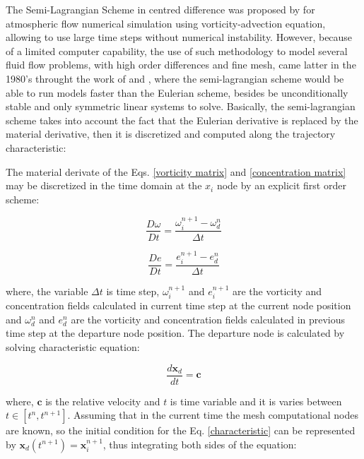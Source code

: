 The Semi-Lagrangian Scheme in centred difference was proposed by \cite{sawyer1963} for atmospheric flow numerical simulation using vorticity-advection equation, allowing to use large time steps without numerical instability. 
However, because of a limited computer capability, the use of such methodology to model several fluid flow problems, with high order differences and fine mesh, came latter in the 1980's throught the work of \cite{robert1981} and \cite{pironneau1982}, where the semi-lagrangian scheme would be able to run models faster than the Eulerian scheme, besides be unconditionally stable and only symmetric linear systems to solve. 
Basically, the semi-lagrangian scheme takes into account the fact that the Eulerian derivative is replaced by the material derivative, then it is discretized and computed along the trajectory characteristic:

The material derivate of the Eqs. \ref{vorticity matrix} and \ref{concentration matrix} may be discretized in the time
domain at the $x_{i}$ node by an explicit first order scheme:



\vspace{-0.4cm}
\begin{equation}
 \frac{D \omega}{D t} = 
 \frac{\omega_{i}^{n+1} - \omega_{d}^{n}}{\Delta t}
\end{equation}

\vspace{-0.8cm}
\begin{equation}
 \frac{D e}{D t} = 
 \frac{e_{i}^{n+1} - e_{d}^{n}}{\Delta t}
\end{equation}


\medskip
\noindent
where, 
the variable $\Delta t$ is time step, 
$\omega_{i}^{n+1}$ and $e_{i}^{n+1}$ are the vorticity and 
concentration fields calculated in current time step at the current 
node position and
$\omega_{d}^{n}$ and $e_{d}^{n}$ are the vorticity and 
concentration fields calculated in previous time step 
at the departure node position.
The departure node is calculated by solving characteristic equation:

\begin{equation} \label{characteristic}
\frac{d\textbf{x}_{d}}{dt} = \textbf{c}
\end{equation}

\medskip
\noindent
where,
$\textbf{c}$ is the relative velocity and
$t$ is time variable and 
it is varies between $t \in \left[t^{n},t^{n+1}\right]$.
Assuming that in the current time the mesh computational nodes
are known, so the initial condition for the Eq. \ref{characteristic}
can be represented by $\textbf{x}_{d}(t^{n+1}) = \textbf{x}_{i}^{n+1}$,
thus integrating both sides of the equation:

